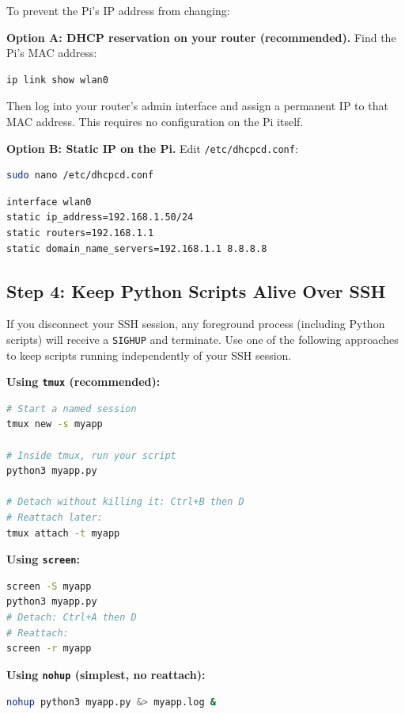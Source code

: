 \documentclass[11pt,letter]{article}
\begin{document}
To prevent the Pi's IP address from changing:

\textbf{Option A: DHCP reservation on your router (recommended).}
Find the Pi's MAC address:
\begin{lstlisting}[language=bash]
ip link show wlan0
\end{lstlisting}
Then log into your router's admin interface and assign a permanent IP to that MAC address. This requires no configuration on the Pi itself.

\textbf{Option B: Static IP on the Pi.}
Edit \texttt{/etc/dhcpcd.conf}:
\begin{lstlisting}[language=bash]
sudo nano /etc/dhcpcd.conf
\end{lstlisting}
\begin{lstlisting}[caption={Static IP configuration in dhcpcd.conf}]
interface wlan0
static ip_address=192.168.1.50/24
static routers=192.168.1.1
static domain_name_servers=192.168.1.1 8.8.8.8
\end{lstlisting}

\subsection{Step 4: Keep Python Scripts Alive Over SSH}

If you disconnect your SSH session, any foreground process (including Python scripts) will receive a \texttt{SIGHUP} and terminate. Use one of the following approaches to keep scripts running independently of your SSH session.

\textbf{Using \texttt{tmux} (recommended):}
\begin{lstlisting}[language=bash, caption={Run Python script in a persistent tmux session}]
# Start a named session
tmux new -s myapp

# Inside tmux, run your script
python3 myapp.py

# Detach without killing it: Ctrl+B then D
# Reattach later:
tmux attach -t myapp
\end{lstlisting}

\textbf{Using \texttt{screen}:}
\begin{lstlisting}[language=bash]
screen -S myapp
python3 myapp.py
# Detach: Ctrl+A then D
# Reattach:
screen -r myapp
\end{lstlisting}

\textbf{Using \texttt{nohup} (simplest, no reattach):}
\begin{lstlisting}[language=bash]
nohup python3 myapp.py &> myapp.log &
\end{lstlisting}
\end{document}
